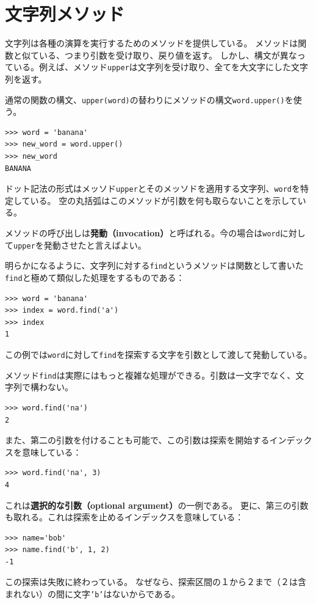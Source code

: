 \documentclass[a4j,12pt,makeidx]{jbook}
\begin{document}
\section{文字列メソッド}
文字列は各種の演算を実行するためのメソッドを提供している。
メソッドは関数と似ている、つまり引数を受け取り、戻り値を返す。
しかし、構文が異なっている。例えば、メソッド{\tt upper}は文字列を受け取り、全てを大文字にした文字列を返す。\par
通常の関数の構文、{\tt upper(word)}の替わりにメソッドの構文{\tt word.upper()}を使う。
\begin{verbatim}
>>> word = 'banana'
>>> new_word = word.upper()
>>> new_word
BANANA
\end{verbatim}
ドット記法の形式はメッソド{\tt upper}とそのメッソドを適用する文字列、{\tt word}を特定している。
空の丸括弧はこのメソッドが引数を何も取らないことを示している。\par
メソッドの呼び出しは{\bf 発動（invocation）}と呼ばれる。今の場合は{\tt word}に対して{\tt upper}を発動させたと言えばよい。\par
明らかになるように、文字列に対する{\tt find}というメソッドは関数として書いた{\tt find}と極めて類似した処理をするものである：
\begin{verbatim}
>>> word = 'banana'
>>> index = word.find('a')
>>> index
1
\end{verbatim}
この例では{\tt word}に対して{\tt find}を探索する文字を引数として渡して発動している。\par
メソッド{\tt find}は実際にはもっと複雑な処理ができる。引数は一文字でなく、文字列で構わない。
\begin{verbatim}
>>> word.find('na')
2
\end{verbatim}
また、第二の引数を付けることも可能で、この引数は探索を開始するインデックスを意味している：
\begin{verbatim}
>>> word.find('na', 3)
4
\end{verbatim}
これは{\bf 選択的な引数（optional argument）}の一例である。
更に、第三の引数も取れる。これは探索を止めるインデックスを意味している：
\begin{verbatim}
>>> name='bob'
>>> name.find('b', 1, 2)
-1
\end{verbatim}
この探索は失敗に終わっている。
なぜなら、探索区間の１から２まで（２は含まれない）の間に文字{\tt 'b'}はないからである。\\
%
\end{document}
